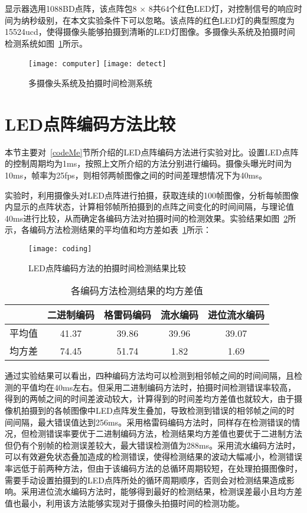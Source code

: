 显示器选用1088BD点阵，该点阵包8 × 8共64个红色LED灯，对控制信号的响应时间为纳秒级别，在本文实验条件下可以忽略。该点阵的红色LED灯的典型照度为15524ucd，使得摄像头能够拍摄到清晰的LED灯图像。多摄像头系统及拍摄时间检测系统如图~\ref{ss}所示。

\begin{figure}[h]
  \centering%
    {\texttt{[image: computer]}}
      {\texttt{[image: detect]}}
  \caption{多摄像头系统及拍摄时间检测系统}
  \label{ss}
\end{figure}

\section{LED点阵编码方法比较}

本节主要对~\ref{codeMe}节所介绍的LED点阵编码方法进行实验对比。设置LED点阵的控制周期均为1ms，按照上文所介绍的方法分别进行编码。摄像头曝光时间为10ms，帧率为25fps，则相邻两帧图像之间的时间差理想情况下为40ms。

实验时，利用摄像头对LED点阵进行拍摄，获取连续的100帧图像，分析每帧图像内显示的点阵状态，计算相邻帧所拍摄到的点阵之间变化的时间间隔，与理论值40ms进行比较，从而确定各编码方法对拍摄时间的检测效果。实验结果如图~\ref{coding}所示，各编码方法检测结果的平均值和均方差如表~\ref{codingT}所示：

\begin{figure}[h] 
  \centering
  \texttt{[image: coding]}
  \caption{LED点阵编码方法的拍摄时间检测结果比较}
    \label{coding}
\end{figure}

\begin{table}[h]
  \centering
  \caption{各编码方法检测结果的均方差值} 
  \label{codingT}
  \begin{tabular}{c|c|c|c|c}\hline
  &  二进制编码 &  格雷码编码 & 流水编码 &  进位流水编码 \\ \hline 
  平均值 & 41.37&39.86 &39.96&39.07\\ \hline
  均方差 & 74.45 & 51.74 & 1.82 &1.69\\ \hline
  \end{tabular}
\end{table}

通过实验结果可以看出，四种编码方法均可以检测到相邻帧之间的时间间隔，且检测的平值均在40ms左右。但采用二进制编码方法时，拍摄时间检测错误率较高，得到的两帧之间的时间差波动较大，计算得到的时间差均方差值也就较大，由于摄像机拍摄到的各帧图像中LED点阵发生叠加，导致检测到错误的相邻帧之间的时间间隔，最大错误值达到256ms。采用格雷码编码方法时，同样存在检测错误的情况，但检测错误率要优于二进制编码方法，检测结果均方差值也要优于二进制方法但仍有个别帧的检测误差较大，最大错误检测值为288ms。采用流水编码方法时，可以有效避免状态叠加造成的检测错误，使得检测结果的波动大幅减小，检测错误率远低于前两种方法，但由于该编码方法的总循环周期较短，在处理拍摄图像时，需要手动设置拍摄到的LED点阵所处的循环周期顺序，否则会对检测结果造成影响。采用进位流水编码方法时，能够得到最好的检测结果，检测误差最小且均方差值也最小，利用该方法能够实现对于摄像头拍摄时间的检测功能。

